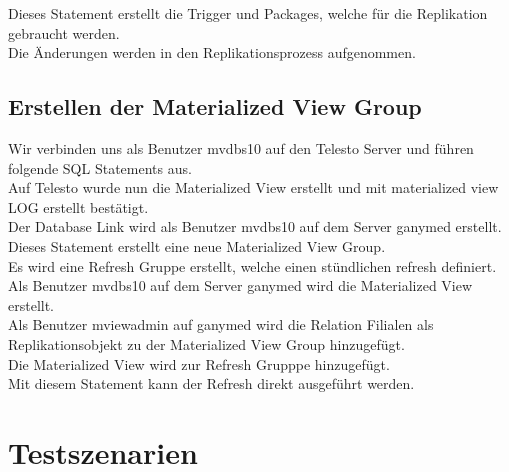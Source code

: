 \documentclass[11pt,a4paper,parskip=half]{scrartcl}
\begin{document}

Dieses Statement erstellt die Trigger und Packages, welche für die Replikation gebraucht werden.\\


Die Änderungen werden in den Replikationsprozess aufgenommen.\\

\subsection{Erstellen der Materialized View Group}
Wir verbinden uns als Benutzer mvdbs10 auf den Telesto Server und führen folgende SQL Statements aus.\\


Auf Telesto wurde nun die Materialized View erstellt und mit \glqq{}materialized view LOG erstellt\grqq{} bestätigt.\\


Der Database Link wird als Benutzer mvdbs10 auf dem Server ganymed erstellt.\\


Dieses Statement erstellt eine neue Materialized View Group.\\


Es wird eine Refresh Gruppe erstellt, welche einen stündlichen refresh definiert.\\


Als Benutzer mvdbs10 auf dem Server ganymed wird die Materialized View erstellt.\\


Als Benutzer mviewadmin auf ganymed wird die Relation Filialen als Replikationsobjekt zu der Materialized View Group hinzugefügt.\\


Die Materialized View wird zur Refresh Grupppe hinzugefügt.\\


Mit diesem Statement kann der Refresh direkt ausgeführt werden.\\

\section{Testszenarien}
\end{document}
